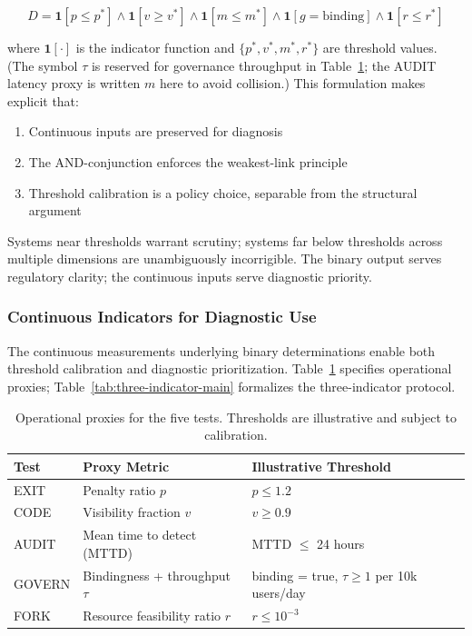 \documentclass{article}
\begin{document}
\begin{equation}
D = \mathbf{1}[p \leq p^*] \land \mathbf{1}[v \geq v^*] \land \mathbf{1}[m \leq m^*] \land \mathbf{1}[g = \text{binding}] \land \mathbf{1}[r \leq r^*]
\end{equation}

where $\mathbf{1}[\cdot]$ is the indicator function and $\{p^*, v^*, m^*, r^*\}$ are threshold values. (The symbol $\tau$ is reserved for governance throughput in Table~\ref{tab:operational-proxies-main}; the AUDIT latency proxy is written $m$ here to avoid collision.) This formulation makes explicit that:
\begin{enumerate}[noitemsep]
    \item Continuous inputs are preserved for diagnosis
    \item The AND-conjunction enforces the weakest-link principle
    \item Threshold calibration is a policy choice, separable from the structural argument
\end{enumerate}

Systems near thresholds warrant scrutiny; systems far below thresholds across multiple dimensions are unambiguously incorrigible. The binary output serves regulatory clarity; the continuous inputs serve diagnostic priority.

\subsubsection{Continuous Indicators for Diagnostic Use}

The continuous measurements underlying binary determinations enable both threshold calibration and diagnostic prioritization. Table~\ref{tab:operational-proxies-main} specifies operational proxies; Table~\ref{tab:three-indicator-main} formalizes the three-indicator protocol.

\begin{table}[htbp]
\centering
\caption{Operational proxies for the five tests. Thresholds are illustrative and subject to calibration.}
\label{tab:operational-proxies-main}
\begin{tabular}{lll}
\toprule
\textbf{Test} & \textbf{Proxy Metric} & \textbf{Illustrative Threshold} \\
\midrule
EXIT & Penalty ratio $p$ & $p \leq 1.2$ \\
CODE & Visibility fraction $v$ & $v \geq 0.9$ \\
AUDIT & Mean time to detect (MTTD) & MTTD $\leq$ 24 hours \\
GOVERN & Bindingness + throughput $\tau$ & binding = true, $\tau \geq 1$ per 10k users/day \\
FORK & Resource feasibility ratio $r$ & $r \leq 10^{-3}$ \\
\bottomrule
\end{tabular}
\end{table}
\end{document}

